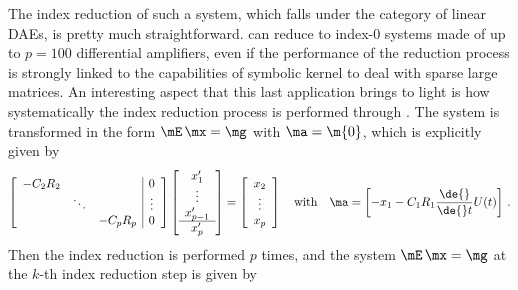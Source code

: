 The index reduction of such a system, which falls under the category of linear \acp{DAE}, is pretty much straightforward. \Indigo{} can reduce to index-0 systems made of up to $p = 100$ differential amplifiers, even if the performance of the reduction process is strongly linked to the capabilities of \Maple{} symbolic kernel to deal with sparse large matrices. An interesting aspect that this last application brings to light is how systematically the index reduction process is performed through \Indigo{}. The system is transformed in the form $\mE \, \mx = \mg$ with $\ma = \m{0}$, which is explicitly given by
%
\begin{equation*}
  \left[\begin{array}{ccc|c}
    -C_2 R_2 & & & 0 \\
    & \ddots & & \vdots \\
    & & -C_p R_p & 0 \\
  \end{array}\right]
  \left[\begin{array}{c}
    x_1^{\prime} \\ \vdots \\ x_{p-1}^{\prime} \\ \hline x_p^{\prime}
  \end{array}\right] = \left[\begin{array}{c}
    x_2 \\ \vdots \\ x_p
  \end{array}\right]
  \quad \text{with} \quad
  \ma = \begin{bmatrix}
    - x_1 - C_1 R_1 \dfrac{\de{}}{\de{}t}U(t)
  \end{bmatrix} \, \text{.}
\end{equation*}
%
Then the index reduction is performed $p$ times, and the system $\mE \, \mx = \mg$ at the $k$-th index reduction step is given by
%
